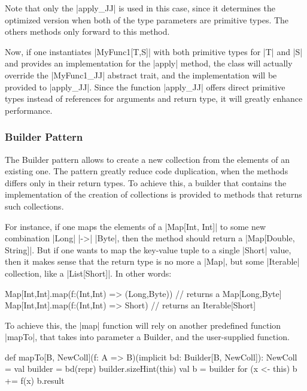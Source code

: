 Note that only the |apply_JJ| is used in this case, since it determines the optimized version when both of the type parameters are primitive types. The others methods only forward to this method.

Now, if one instantiates |MyFunc1[T,S]| with both primitive types for |T| and |S| and provides an implementation for the |apply| method, the class will actually override the |MyFunc1_JJ| abstract trait, and the implementation will be provided to |apply_JJ|. Since the function |apply_JJ| offers direct primitive types instead of references for arguments and return type, it will greatly enhance performance.

\subsubsection{Builder Pattern}

The Builder pattern allows to create a new collection from the elements of an existing one. The pattern greatly reduce code duplication, when the methods differs only in their return types. To achieve this, a builder that contains the implementation of the creation of collections is provided to methods that returns such collections.


For instance, if one maps the elements of a |Map[Int, Int]| to some new combination |Long| |->| |Byte|, then the method should return a |Map[Double, String]|. But if one wants to map the key-value tuple to a single |Short| value, then it makes sense that the return type is no more a |Map|, but some |Iterable| collection, like a |List[Short]|. In other words:

\begin{lstlisting-nobreak}
 Map[Int,Int].map(f:(Int,Int) => (Long,Byte))
      // returns a Map[Long,Byte]
 Map[Int,Int].map(f:(Int,Int) => Short)
      // returns an Iterable[Short]
\end{lstlisting-nobreak}

To achieve this, the |map| function will rely on another predefined function |mapTo|, that takes into parameter a Builder, and the user-supplied function.

\begin{lstlisting-nobreak}
 def mapTo[B, NewColl](f: A => B)(implicit bd: Builder[B, NewColl]): NewColl = {
   val builder = bd(repr)
   builder.sizeHint(this)
   val b = builder
   for (x <- this) b += f(x)
   b.result
 }
\end{lstlisting-nobreak}




